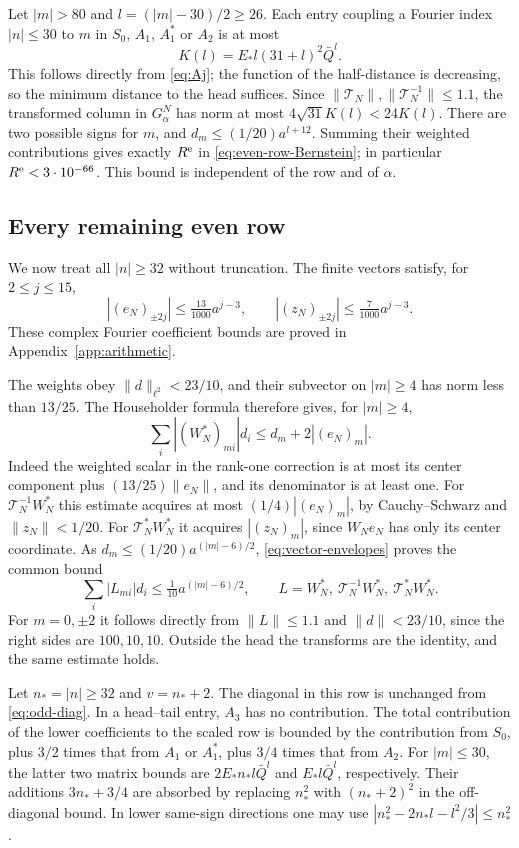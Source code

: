 \documentclass[a4paper,11pt]{article}
\numberwithin{equation}{section}
\theoremstyle{definition}
\theoremstyle{remark}
\newcommand{\norm}[1]{\lVert#1\rVert}
\newcommand{\calT}{\mathcal T}
\begin{document}
Let $|m|>80$ and $l=(|m|-30)/2\ge26$. Each entry coupling a Fourier index $|n|\le30$ to $m$ in $S_0$, $A_1$, $A_1^*$ or $A_2$ is at most
\[
 K(l)=E_*l(31+l)^2\bar Q^l.
\]
This follows directly from \eqref{eq:Aj}; the function of the half-distance is decreasing, so the minimum distance to the head suffices. Since $\norm{\calT_N},\norm{\calT_N^{-1}}\le1.1$, the transformed column in $G_\alpha^N$ has norm at most $4\sqrt{31}K(l)<24K(l)$. There are two possible signs for $m$, and $d_m\le(1/20)a^{l+12}$. Summing their weighted contributions gives exactly $R^{\rm e}$ in \eqref{eq:even-row-Bernstein}; in particular $R^{\rm e}<3\cdot10^{-66}$. This bound is independent of the row and of $\alpha$.

\subsection{Every remaining even row}
We now treat all $|n|\ge32$ without truncation. The finite vectors satisfy, for $2\le j\le15$,
\begin{equation}\label{eq:vector-envelopes}
 |(e_N)_{\pm2j}|\le\tfrac{13}{1000}a^{j-3},\qquad
 |(z_N)_{\pm2j}|\le\tfrac7{1000}a^{j-3}.
\end{equation}
These complex Fourier coefficient bounds are proved in Appendix~\ref{app:arithmetic}.

The weights obey $\norm d_{\ell^2}<23/10$, and their subvector on $|m|\ge4$ has norm less than $13/25$. The Householder formula therefore gives, for $|m|\ge4$,
\[
 \sum_i|(W_N^*)_{mi}|d_i\le d_m+2|(e_N)_m|.
\]
Indeed the weighted scalar in the rank-one correction is at most its center component plus $(13/25)\norm{e_N}$, and its denominator is at least one. For $\calT_N^{-1}W_N^*$ this estimate acquires at most $(1/4)|(e_N)_m|$, by Cauchy--Schwarz and $\norm{z_N}<1/20$. For $\calT_N^*W_N^*$ it acquires $|(z_N)_m|$, since $W_Ne_N$ has only its center coordinate. As $d_m\le(1/20)a^{(|m|-6)/2}$, \eqref{eq:vector-envelopes} proves the common bound
\begin{equation}\label{eq:transform-envelope}
 \sum_i|L_{mi}|d_i\le\tfrac1{10}a^{(|m|-6)/2},
 \qquad L=W_N^*,\ \calT_N^{-1}W_N^*,\ \calT_N^*W_N^*.
\end{equation}
For $m=0,\pm2$ it follows directly from $\norm L\le1.1$ and $\norm d<23/10$, since the right sides are $100,10,10$. Outside the head the transforms are the identity, and the same estimate holds.

Let $n_*=|n|\ge32$ and $v=n_*+2$. The diagonal in this row is unchanged from \eqref{eq:odd-diag}. In a head--tail entry, $A_3$ has no contribution. The total contribution of the lower coefficients to the scaled row is bounded by the contribution from $S_0$, plus $3/2$ times that from $A_1$ or $A_1^*$, plus $3/4$ times that from $A_2$. For $|m|\le30$, the latter two matrix bounds are $2E_*n_*l\bar Q^l$ and $E_*l\bar Q^l$, respectively. Their additions $3n_*+3/4$ are absorbed by replacing $n_*^2$ with $(n_*+2)^2$ in the off-diagonal bound. In lower same-sign directions one may use $|n_*^2-2n_*l-l^2/3|\le n_*^2$.
\end{document}
